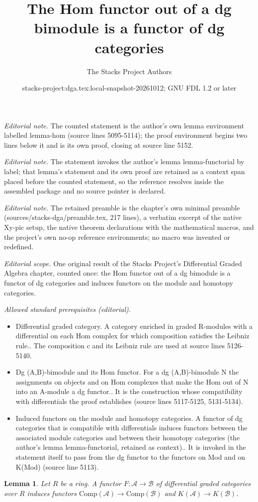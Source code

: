 \documentclass{stacks-project}
\title{The Hom functor out of a dg bimodule is a functor of dg categories}
\author{The Stacks Project Authors}
\date{stacks-project:dga.tex:local-snapshot-20261012; GNU FDL 1.2 or later}
\theoremstyle{plain}
\newtheorem{lemma}[subsection]{Lemma}
\theoremstyle{definition}
\theoremstyle{remark}
\numberwithin{equation}{subsection}
\begin{document}
\maketitle
\noindent\textit{Editorial note.} The counted statement is the author's own lemma environment labelled lemma-hom (source lines 5095-5114); the proof environment begins two lines below it and is its own proof, closing at source line 5152.\par\medskip
\noindent\textit{Editorial note.} The statement invokes the author's lemma lemma-functorial by label; that lemma's statement and its own proof are retained as a context span placed before the counted statement, so the reference resolves inside the assembled package and no source pointer is declared.\par\medskip
\noindent\textit{Editorial note.} The retained preamble is the chapter's own minimal preamble (sources/stacks-dga/preamble.tex, 217 lines), a verbatim excerpt of the native Xy-pic setup, the native theorem declarations with the mathematical macros, and the project's own no-op reference environments; no macro was invented or redefined.\par\medskip
\noindent\textit{Editorial scope.} One original result of the Stacks Project's Differential Graded Algebra chapter, counted once: the Hom functor out of a dg bimodule is a functor of dg categories and induces functors on the module and homotopy categories.\par\medskip
\noindent\textit{Allowed standard prerequisites (editorial).}\begin{itemize}
\item Differential graded category. A category enriched in graded R-modules with a differential on each Hom complex for which composition satisfies the Leibniz rule.. The composition c and its Leibniz rule are used at source lines 5126-5140.
\item Dg (A,B)-bimodule and its Hom functor. For a dg (A,B)-bimodule N the assignments on objects and on Hom complexes that make the Hom out of N into an A-module a dg functor.. It is the construction whose compatibility with differentials the proof establishes (source lines 5117-5125, 5131-5134).
\item Induced functors on the module and homotopy categories. A functor of dg categories that is compatible with differentials induces functors between the associated module categories and between their homotopy categories (the author's lemma lemma-functorial, retained as context).. It is invoked in the statement itself to pass from the dg functor to the functors on Mod and on K(Mod) (source line 5113).
\end{itemize}\medskip
\begin{lemma}
\label{lemma-functorial}
Let $R$ be a ring. A functor $F : \mathcal{A} \to \mathcal{B}$
of differential graded categories over $R$ induces functors
$\text{Comp}(\mathcal{A}) \to \text{Comp}(\mathcal{B})$
and $K(\mathcal{A}) \to K(\mathcal{B})$.
\end{lemma}
\end{document}
